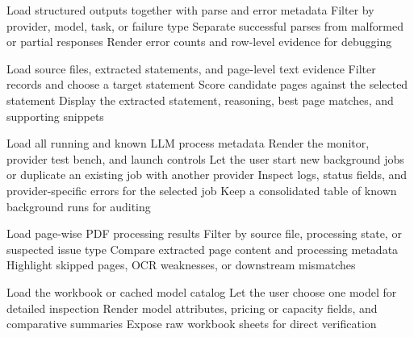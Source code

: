 \begin{algorithm}[H]
Load structured outputs together with parse and error metadata\;
Filter by provider, model, task, or failure type\;
Separate successful parses from malformed or partial responses\;
Render error counts and row-level evidence for debugging\;
\caption{LLM Error and Parse Audit}
\label{alg:llm-error-parse-audit}
\end{algorithm}

\begin{algorithm}[H]
Load source files, extracted statements, and page-level text evidence\;
Filter records and choose a target statement\;
Score candidate pages against the selected statement\;
Display the extracted statement, reasoning, best page matches, and supporting snippets\;
\caption{LLM Statement Page Verifier}
\label{alg:llm-statement-page-verifier}
\end{algorithm}

\begin{algorithm}[H]
Load all running and known LLM process metadata\;
Render the monitor, provider test bench, and launch controls\;
Let the user start new background jobs or duplicate an existing job with another provider\;
Inspect logs, status fields, and provider-specific errors for the selected job\;
Keep a consolidated table of known background runs for auditing\;
\caption{LLM Background Run Monitor}
\label{alg:llm-background-run-monitor}
\end{algorithm}

\begin{algorithm}[H]
Load page-wise PDF processing results\;
Filter by source file, processing state, or suspected issue type\;
Compare extracted page content and processing metadata\;
Highlight skipped pages, OCR weaknesses, or downstream mismatches\;
\caption{PDF Page Processing Audit}
\label{alg:pdf-page-processing-audit}
\end{algorithm}

\begin{algorithm}[H]
Load the workbook or cached model catalog\;
Let the user choose one model for detailed inspection\;
Render model attributes, pricing or capacity fields, and comparative summaries\;
Expose raw workbook sheets for direct verification\;
\caption{LLM Model Catalog Visualizer}
\label{alg:llm-model-catalog}
\end{algorithm}

